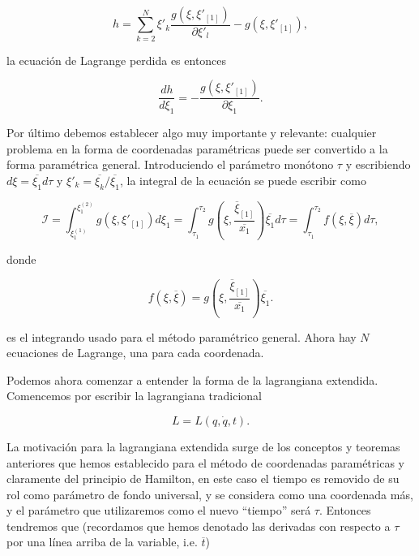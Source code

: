 \documentclass[a4paper,10pt]{article}
\numberwithin{equation}{section}
\begin{document}
\begin{equation}
 h = \sum_{k=2}^{N} \xi'_k\frac{g(\xi,\xi'_{[1]})}{\partial \xi'_l} - g(\xi,\xi'_{[1]}),
\label{eq:6segundaForma}
\end{equation}

la ecuación de Lagrange perdida es entonces 

\begin{equation}
 \frac{dh}{d\xi_1} = - \frac{g(\xi,\xi'_{[1]})}{\partial \xi_1}.
 \label{eq:6lagrangeEqs2}
\end{equation}

Por último debemos establecer algo muy importante y relevante: cualquier problema 
en la forma de coordenadas paramétricas puede ser convertido a la forma paramétrica 
general. Introduciendo el parámetro monótono $\tau$ y escribiendo $d\xi = \overline{\xi_1}d\tau$ 
y $\xi'_k = \overline{\xi_k}/\overline{\xi_1}$, la integral de la ecuación 
 se puede escribir como

\begin{equation}
  \mathcal{I} = \int_{\xi_1^{(1)}}^{\xi_1^{(2)}} g(\xi,\xi'_{[1]})d\xi_1 = 
  \int_{\tau_1}^{\tau_2} g\left(\xi,\frac{\overline{\xi}_{[1]}}{\overline{x_1}}\right) \overline{\xi_1}d\tau 
  =  \int_{\tau_1}^{\tau_2} f(\xi,\overline{\xi})d\tau,
  \label{eq:6accion2}
\end{equation}

donde

\begin{equation}
 f(\xi,\overline{\xi}) = g\left(\xi,\frac{\overline{\xi}_{[1]}}{\overline{x_1}}\right)\overline{\xi_1}.
 \label{eq:6motivacionLext}
\end{equation}

es el integrando usado para el método paramétrico general. Ahora hay $N$ ecuaciones de 
Lagrange, una para cada coordenada. 

\vspace{.3cm}

Podemos ahora comenzar a entender la forma de la lagrangiana extendida. Comencemos 
por escribir la lagrangiana tradicional

\begin{equation}
 L = L(q,\dot{q},t).
 \label{eq:6lagrangianaNormal}
\end{equation}

La motivación para la lagrangiana extendida surge de los conceptos y teoremas anteriores 
que hemos establecido para el método de coordenadas paramétricas y claramente 
del principio de Hamilton, en este caso el tiempo es removido de su rol como
parámetro de fondo universal, y se considera como una coordenada más, y el 
parámetro que utilizaremos como el nuevo ``tiempo'' será $\tau$. Entonces tendremos
que (recordamos que hemos denotado las derivadas con respecto a $\tau$ por una línea 
arriba de la variable, i.e. $\overline{t}$)
\end{document}
